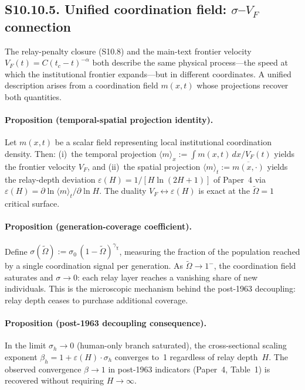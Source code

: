 \documentclass[11pt]{article}
\begin{document}
\subsection*{S10.10.5. Unified coordination field: $\sigma$--$V_F$ connection}

The relay-penalty closure (S10.8) and the main-text frontier velocity
$V_F(t) = C(t_c - t)^{-\alpha}$ both describe the same physical process---the
speed at which the institutional frontier expands---but in different
coordinates. A unified description arises from a coordination field
$m(x,t)$ whose projections recover both quantities.

\paragraph{Proposition (temporal-spatial projection identity).}
Let $m(x,t)$ be a scalar field representing local institutional coordination
density. Then:
(i)~the temporal projection $\langle m \rangle_x := \int m(x,t)\,dx / V_F(t)$
yields the frontier velocity $V_F$, and
(ii)~the spatial projection $\langle m \rangle_t := \overline{m(x,\cdot)}$
yields the relay-depth deviation $\varepsilon(H) = 1/[H\ln(2H+1)]$ of
Paper~4 via $\varepsilon(H) = \partial \ln\langle m\rangle_t / \partial \ln H$.
The duality $V_F \leftrightarrow \varepsilon(H)$ is exact at the
$\tilde\Omega = 1$ critical surface.

\paragraph{Proposition (generation-coverage coefficient).}
Define $\sigma(\tilde\Omega) := \sigma_0\,(1-\tilde\Omega)^{\gamma_\chi}$,
measuring the fraction of the population reached by a single coordination
signal per generation. As $\tilde\Omega \to 1^-$, the coordination field
saturates and $\sigma \to 0$: each relay layer reaches a vanishing share of
new individuals. This is the microscopic mechanism behind the post-1963
decoupling: relay depth ceases to purchase additional coverage.

\paragraph{Proposition (post-1963 decoupling consequence).}
In the limit $\sigma_h \to 0$ (human-only branch saturated),
the cross-sectional scaling exponent $\beta_h = 1 + \varepsilon(H)\cdot\sigma_h$
converges to~1 regardless of relay depth~$H$.
The observed convergence $\beta \to 1$ in post-1963 indicators
(Paper~4, Table~1) is recovered without requiring $H\to\infty$.
\end{document}
